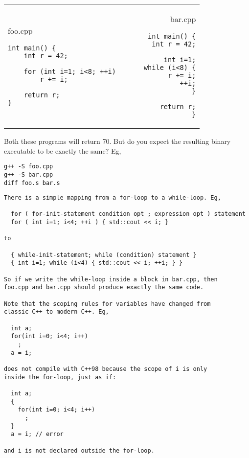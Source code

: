\documentclass[landscape]{slides}
\begin{document}

\begin{slide}

\begin{tabular*}{\textwidth}{@{\extracolsep{\fill}}lr}

\begin{minipage}[t]{.45\linewidth}
\tiny{foo.cpp}
\begin{lstlisting}
int main() {
    int r = 42;

    for (int i=1; i<8; ++i) 
        r += i;

    return r;
}
\end{lstlisting}
\end{minipage}
&
\begin{minipage}[t]{.45\linewidth}
\tiny{bar.cpp}
\begin{lstlisting}
int main() {
    int r = 42;

    int i=1;
    while (i<8) {
        r += i;
        ++i;
    }

    return r;
}
\end{lstlisting}
\end{minipage}
\end{tabular*}

Both these programs will return 70. But do you expect the resulting binary executable to be exactly the same? Eg,
\begin{verbatim}
g++ -S foo.cpp
g++ -S bar.cpp
diff foo.s bar.s
\end{verbatim}

\begin{note}
\begin{tiny}
\begin{verbatim}
There is a simple mapping from a for-loop to a while-loop. Eg,

  for ( for-init-statement condition_opt ; expression_opt ) statement
  for ( int i=1; i<4; ++i ) { std::cout << i; }

to

  { while-init-statement; while (condition) statement }
  { int i=1; while (i<4) { std::cout << i; ++i; } }

So if we write the while-loop inside a block in bar.cpp, then
foo.cpp and bar.cpp should produce exactly the same code.

Note that the scoping rules for variables have changed from 
classic C++ to modern C++. Eg,

  int a;
  for(int i=0; i<4; i++) 
    ;
  a = i;

does not compile with C++98 because the scope of i is only
inside the for-loop, just as if:

  int a;
  {
    for(int i=0; i<4; i++) 
      ;
  }
  a = i; // error

and i is not declared outside the for-loop.
\end{verbatim}
\end{tiny}
\end{note}

\end{slide}
\end{document}
